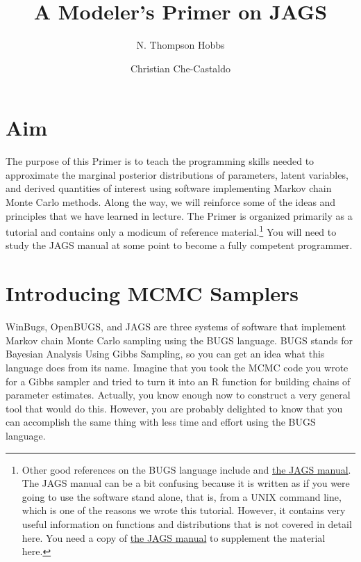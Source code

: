 \documentclass[12pt,english]{article}
\begin{document}
\title{A Modeler's Primer on JAGS}

\author[1]{N. Thompson Hobbs}
\author[2]{Christian Che-Castaldo}


\maketitle

\newpage

\tableofcontents{}
\listofalgorithms
\listofexercises

\newpage

\section{Aim}

The purpose of this Primer is to teach the programming skills needed to approximate the marginal posterior distributions of parameters, latent variables, and derived quantities of interest using software implementing Markov chain Monte Carlo methods. Along the way, we will reinforce some of the ideas and principles that we have learned in lecture. The Primer is organized primarily as a tutorial and contains only a modicum of reference material.\footnote{Other good references on the BUGS language include \citet{McCarthy_Bayes_book} and \href{https://sourceforge.net/projects/mcmc-jags/files/Manuals/4.x/}{the JAGS manual}. The JAGS manual can be a bit confusing because it is written as if you were going to use the software stand alone, that is, from a UNIX command line, which is one of the reasons we wrote this tutorial. However, it contains very useful information on functions and distributions that is not covered in detail here. You need a copy of \href{https://sourceforge.net/projects/mcmc-jags/files/Manuals/4.x/}{the JAGS manual} to supplement the material here.}  You will need to study the JAGS manual at some point to become a fully competent programmer. 

\section{Introducing MCMC Samplers}

WinBugs, OpenBUGS, and JAGS are three systems of software that implement Markov chain Monte Carlo sampling using the BUGS language. BUGS stands for Bayesian Analysis Using Gibbs Sampling, so you can get an idea what this language does from its name. Imagine that you took the MCMC code you wrote for a Gibbs sampler and tried to turn it into an R function for building chains of parameter estimates. Actually, you know enough now to construct a very general tool that would do this. However, you are probably delighted to know that you can accomplish the same thing with less time and effort using the BUGS language. 
\end{document}
